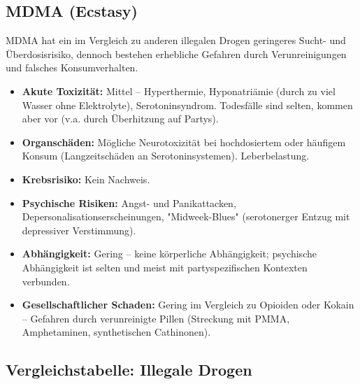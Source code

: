 \documentclass[11pt,a4paper]{article}
\begin{document}
	\subsection{MDMA (Ecstasy)}
	
	MDMA hat ein im Vergleich zu anderen illegalen Drogen geringeres Sucht- und Überdosisrisiko, dennoch bestehen erhebliche Gefahren durch Verunreinigungen und falsches Konsumverhalten. \cite{drugcom-mdma}
	
	\begin{itemize}[leftmargin=*, noitemsep]
		\item \textbf{Akute Toxizität:} Mittel – Hyperthermie, Hyponatriämie (durch zu viel Wasser ohne Elektrolyte), Serotoninsyndrom. Todesfälle sind selten, kommen aber vor (v.a. durch Überhitzung auf Partys).
		\item \textbf{Organschäden:} Mögliche Neurotoxizität bei hochdosiertem oder häufigem Konsum (Langzeitschäden an Serotoninsystemen). Leberbelastung.
		\item \textbf{Krebsrisiko:} Kein Nachweis.
		\item \textbf{Psychische Risiken:} Angst- und Panikattacken, Depersonalisationserscheinungen, "Midweek-Blues" (serotonerger Entzug mit depressiver Verstimmung).
		\item \textbf{Abhängigkeit:} Gering – keine körperliche Abhängigkeit; psychische Abhängigkeit ist selten und meist mit partyspezifischen Kontexten verbunden.
		\item \textbf{Gesellschaftlicher Schaden:} Gering im Vergleich zu Opioiden oder Kokain – Gefahren durch verunreinigte Pillen (Streckung mit PMMA, Amphetaminen, synthetischen Cathinonen).
	\end{itemize}
	
	\subsection{Vergleichstabelle: Illegale Drogen}
	
\end{document}
